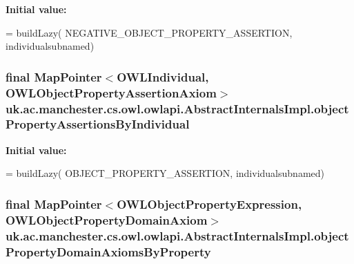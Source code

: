 {\bfseries Initial value\-:}
\begin{DoxyCode}
= buildLazy(
            NEGATIVE\_OBJECT\_PROPERTY\_ASSERTION, individualsubnamed)
\end{DoxyCode}
\hypertarget{classuk_1_1ac_1_1manchester_1_1cs_1_1owl_1_1owlapi_1_1_abstract_internals_impl_a024db6e8abd1ec6db0038e0e3b149f16}{
\subsubsection[{object\-Property\-Assertions\-By\-Individual}]{\setlength{\rightskip}{0pt plus 5cm}final Map\-Pointer$<${\bf O\-W\-L\-Individual}, {\bf O\-W\-L\-Object\-Property\-Assertion\-Axiom}$>$ uk.\-ac.\-manchester.\-cs.\-owl.\-owlapi.\-Abstract\-Internals\-Impl.\-object\-Property\-Assertions\-By\-Individual\hspace{0.3cm}{\ttfamily [protected]}}}\label{classuk_1_1ac_1_1manchester_1_1cs_1_1owl_1_1owlapi_1_1_abstract_internals_impl_a024db6e8abd1ec6db0038e0e3b149f16}
{\bfseries Initial value\-:}
\begin{DoxyCode}
= buildLazy(
            OBJECT\_PROPERTY\_ASSERTION, individualsubnamed)
\end{DoxyCode}
\hypertarget{classuk_1_1ac_1_1manchester_1_1cs_1_1owl_1_1owlapi_1_1_abstract_internals_impl_a668859e89951b4e378009626f5b8346c}{
\subsubsection[{object\-Property\-Domain\-Axioms\-By\-Property}]{\setlength{\rightskip}{0pt plus 5cm}final Map\-Pointer$<${\bf O\-W\-L\-Object\-Property\-Expression}, {\bf O\-W\-L\-Object\-Property\-Domain\-Axiom}$>$ uk.\-ac.\-manchester.\-cs.\-owl.\-owlapi.\-Abstract\-Internals\-Impl.\-object\-Property\-Domain\-Axioms\-By\-Property\hspace{0.3cm}{\ttfamily [protected]}}}\label{classuk_1_1ac_1_1manchester_1_1cs_1_1owl_1_1owlapi_1_1_abstract_internals_impl_a668859e89951b4e378009626f5b8346c}

